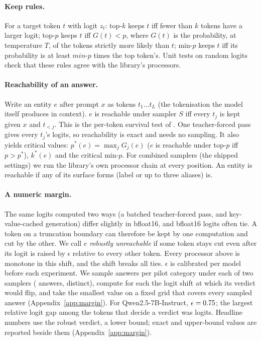 \documentclass[11pt]{article}
\begin{document}
\paragraph{Keep rules.} For a target token $t$ with logit $z_t$: top-$k$ keeps $t$ iff fewer than $k$ tokens have a larger logit; top-$p$ keeps $t$ iff $G(t)<p$, where $G(t)$ is the probability, at temperature $T$, of the tokens strictly more likely than $t$; min-$p$ keeps $t$ iff its probability is at least $\textit{min-p}$ times the top token's. Unit tests on random logits check that these rules agree with the library's processors.

\paragraph{Reachability of an answer.} Write an entity $e$ after prompt $x$ as tokens $t_1\ldots t_L$ (the tokenisation the model itself produces in context). $e$ is reachable under sampler $S$ iff every $t_j$ is kept given $x$ and $t_{<j}$. This is the per-token survival test of \citet{awad2026lost}. One teacher-forced pass gives every $t_j$'s logits, so reachability is exact and needs no sampling. It also yields critical values: $p^*(e)=\max_j G_j(e)$ ($e$ is reachable under top-$p$ iff $p>p^*$), $k^*(e)$ and the critical min-$p$. For combined samplers (the shipped settings) we run the library's own processor chain at every position. An entity is reachable if any of its surface forms (label or up to three aliases) is.

\paragraph{A numeric margin.} The same logits computed two ways (a batched teacher-forced pass, and key-value-cached generation) differ slightly in bfloat16, and bfloat16 logits often tie. A token on a truncation boundary can therefore be kept by one computation and cut by the other. We call $e$ \emph{robustly unreachable} if some token stays cut even after its logit is raised by $\epsilon$ relative to every other token. Every processor above is monotone in this shift, and the shift breaks all ties. $\epsilon$ is calibrated per model before each experiment. We sample \gzCalPerCategory{} answers per pilot category under each of two samplers (\gzCalSamples{} answers, \gzCalSeqs{} distinct), compute for each the logit shift at which its verdict would flip, and take the smallest value on a fixed grid that covers every sampled answer (Appendix~\ref{app:margin}). For Qwen2.5-7B-Instruct, $\epsilon=0.75$; the largest relative logit gap among the tokens that decide a verdict was \gzGapMax{} logits. Headline numbers use the robust verdict, a lower bound; exact and upper-bound values are reported beside them (Appendix~\ref{app:margin}).
\end{document}
